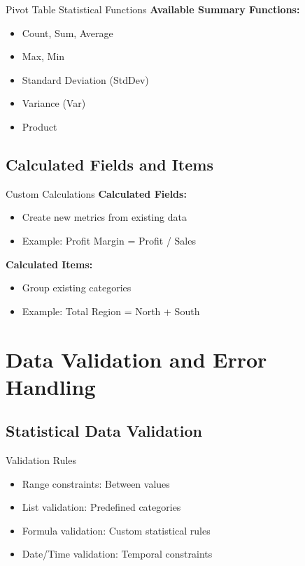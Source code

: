 \documentclass[12pt,a4paper]{book}
\begin{document}
{{\begin{example}{Pivot Table Statistical Functions}
\textbf{Available Summary Functions:}
\begin{itemize}
    \item Count, Sum, Average
    \item Max, Min
    \item Standard Deviation (StdDev)
    \item Variance (Var)
    \item Product
\end{itemize}
\end{example}

\subsection{Calculated Fields and Items}

\begin{example}{Custom Calculations}
\textbf{Calculated Fields:}
\begin{itemize}
    \item Create new metrics from existing data
    \item Example: Profit Margin = Profit / Sales
\end{itemize}

\textbf{Calculated Items:}
\begin{itemize}
    \item Group existing categories
    \item Example: Total Region = North + South
\end{itemize}
\end{example}

\section{Data Validation and Error Handling}

\subsection{Statistical Data Validation}

\begin{example}{Validation Rules}
\begin{itemize}
    \item Range constraints: Between values
    \item List validation: Predefined categories
    \item Formula validation: Custom statistical rules
    \item Date/Time validation: Temporal constraints
\end{itemize}
\end{example}

}}
\end{document}
